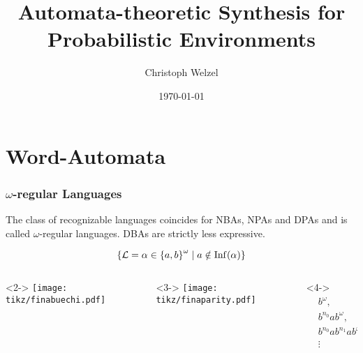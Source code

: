 \documentclass{beamer}
\title[Syn. for prob. Env.]{
  Automata-theoretic Synthesis for Probabilistic Environments}
\date{\today}
\author{Christoph Welzel}
\institute{Informatik 7, RWTH Aachen}
\begin{document}
  \acuseall

  \maketitle

  \section{Word-Automata}
  \begin{frame}
    \frametitle{$\omega$-regular Languages}
    \begin{theorem}
      The class of recognizable languages coincides for \alert<2>{\acp{NBA}},
      \alert<3>{\acp{NPA} and \acp{DPA}} and is called $\omega$-regular
      languages. \alert<4>{\acp{DBA} are strictly less expressive.}
    \end{theorem}
    \begin{overlayarea}{\textwidth}{0.5\textheight}
        \begin{equation*}
          \left\{
            \mathcal{L} = \alpha\in\left\{a,b\right\}^{\omega}\mid a\notin\operatorname{Inf}(\alpha)
          \right\}
        \end{equation*}
        \begin{columns}
          \begin{column}{0.3\textwidth}<2->
            \texttt{[image: tikz/finabuechi.pdf]}
          \end{column}
          \begin{column}{0.3\textwidth}<3->
            \texttt{[image: tikz/finaparity.pdf]}
          \end{column}
          \begin{column}{0.3\textwidth}<4->
            \begin{align*}
              &b^{\omega},\\
              &b^{n_{0}}ab^{\omega},\\
              &b^{n_{0}}ab^{n_{1}}ab^{\omega},\\
              &\vdots
            \end{align*}
          \end{column}
        \end{columns}
    \end{overlayarea}
  \end{frame}
\end{document}
